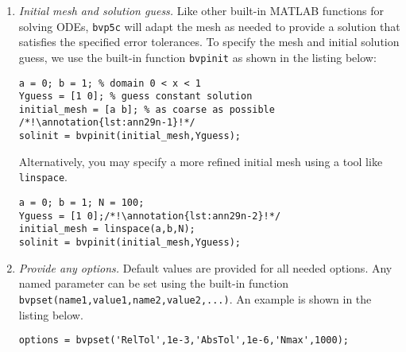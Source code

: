\begin{enumerate}
\item \emph{Initial mesh and solution guess.} Like other built-in MATLAB functions for solving ODEs, \lstinline[style=myMatlab]{bvp5c} will adapt the mesh as needed to provide a solution that satisfies the specified error tolerances. To specify the mesh and initial solution guess, we use the built-in function \lstinline[style=myMatlab]{bvpinit} as shown in the listing below:
\begin{lstlisting}[style=myMatlab]
a = 0; b = 1; % domain 0 < x < 1
Yguess = [1 0]; % guess constant solution
initial_mesh = [a b]; % as coarse as possible /*!\annotation{lst:ann29n-1}!*/
solinit = bvpinit(initial_mesh,Yguess);
\end{lstlisting}
Alternatively, you may specify a more refined initial mesh using a tool like \lstinline[style=myMatlab]{linspace}. 
\begin{lstlisting}[style=myMatlab]
a = 0; b = 1; N = 100;
Yguess = [1 0];/*!\annotation{lst:ann29n-2}!*/
initial_mesh = linspace(a,b,N);
solinit = bvpinit(initial_mesh,Yguess);
\end{lstlisting}

\item \emph{Provide any options.}  Default values are provided for all needed options.  Any named parameter can be set using the built-in function \lstinline[style=myMatlab]{bvpset(name1,value1,name2,value2,...)}.  An example is shown in the listing below.
\begin{lstlisting}[style=myMatlab]
options = bvpset('RelTol',1e-3,'AbsTol',1e-6,'Nmax',1000);
\end{lstlisting} 

\end{enumerate}
